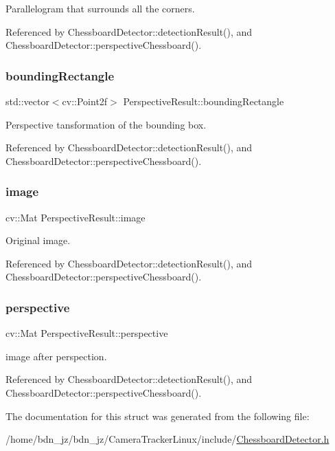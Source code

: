 Parallelogram that surrounds all the corners. 

Referenced by Chessboard\+Detector\+::detection\+Result(), and Chessboard\+Detector\+::perspective\+Chessboard().

\mbox{\label{structPerspectiveResult_a78e1db1b132a9e364ab5f2c3b452b611}} 
\subsubsection{\texorpdfstring{bounding\+Rectangle}{boundingRectangle}}
{\footnotesize\ttfamily std\+::vector$<$cv\+::\+Point2f$>$ Perspective\+Result\+::bounding\+Rectangle}

Perspective tansformation of the bounding box. 

Referenced by Chessboard\+Detector\+::detection\+Result(), and Chessboard\+Detector\+::perspective\+Chessboard().

\mbox{\label{structPerspectiveResult_a0d73af1103688870135ebb3ff7bcdbdc}} 
\subsubsection{\texorpdfstring{image}{image}}
{\footnotesize\ttfamily cv\+::\+Mat Perspective\+Result\+::image}

Original image. 

Referenced by Chessboard\+Detector\+::detection\+Result(), and Chessboard\+Detector\+::perspective\+Chessboard().

\mbox{\label{structPerspectiveResult_af3e15ad54fa2f84ad2d782a2f0fd6e73}} 
\subsubsection{\texorpdfstring{perspective}{perspective}}
{\footnotesize\ttfamily cv\+::\+Mat Perspective\+Result\+::perspective}

image after perspection. 

Referenced by Chessboard\+Detector\+::detection\+Result(), and Chessboard\+Detector\+::perspective\+Chessboard().



The documentation for this struct was generated from the following file\+:\begin{DoxyCompactItemize}
\item 
/home/bdn\+\_\+jz/bdn\+\_\+jz/\+Camera\+Tracker\+Linux/include/\hyperlink{ChessboardDetector_8h}{Chessboard\+Detector.\+h}\end{DoxyCompactItemize}
